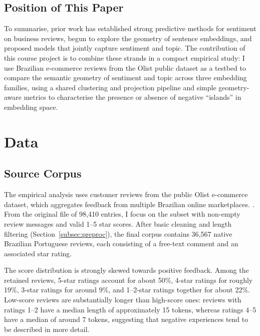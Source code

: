 \documentclass[a4paper,11pt]{article}
\begin{document}
\subsection{Position of This Paper}

To summarise, prior work has established strong predictive methods for sentiment on business reviews, begun to explore the geometry of sentence embeddings, and proposed models that jointly capture sentiment and topic. 
The contribution of this course project is to combine these strands in a compact empirical study: I use Brazilian e-commerce reviews from the Olist public dataset \citep{olist_kaggle_dataset} as a testbed to compare the semantic geometry of sentiment and topic across three embedding families, using a shared clustering and projection pipeline and simple geometry-aware metrics to characterise the presence or absence of negative “islands” in embedding space.

\section{Data}
\label{sec:data}

\subsection{Source Corpus}
The empirical analysis uses customer reviews from the public Olist e-commerce dataset, which aggregates feedback from multiple Brazilian online marketplaces.  \citep{olist_kaggle_dataset}. 
From the original file of 98{,}410 entries, I focus on the subset with non-empty review messages and valid 1--5 star scores. 
After basic cleaning and length filtering (Section~\ref{subsec:preproc}), the final corpus contains 36{,}567 native Brazilian Portuguese reviews, each consisting of a free-text comment and an associated star rating.

The score distribution is strongly skewed towards positive feedback. 
Among the retained reviews, 5-star ratings account for about 50\%, 4-star ratings for roughly 19\%, 3-star ratings for around 9\%, and 1–2-star ratings together for about 22\%. 
Low-score reviews are substantially longer than high-score ones: reviews with ratings 1–2 have a median length of approximately 15 tokens, whereas ratings 4–5 have a median of around 7 tokens, suggesting that negative experiences tend to be described in more detail.
\end{document}
